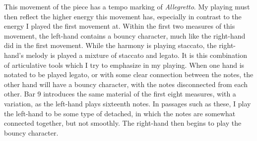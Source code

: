 This movement of the piece has a tempo marking of \textit{Allegretto}. My playing must then reflect the higher energy this movement has, especially in contrast to the energy I played the first movement at. Within the first two measures of this movement, the left-hand contains a bouncy character, much like the right-hand did in the first movement. While the harmony is playing staccato, the right-hand's melody is played a mixture of staccato and legato. It is this combination of articulative tools which I try to emphasize in my playing. When one hand is notated to be played legato, or with some clear connection between the notes, the other hand will have a bouncy character, with the notes disconnected from each other. Bar 9 introduces the same material of the first eight measures, with a variation, as the left-hand plays sixteenth notes. In passages such as these, I play the left-hand to be some type of detached, in which the notes are somewhat connected together, but not smoothly. The right-hand then begins to play the bouncy character.